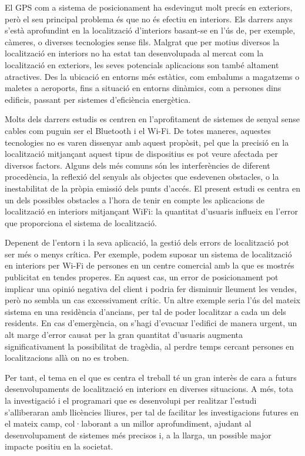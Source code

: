 
El GPS com a sistema de posicionament ha esdevingut molt precís en exteriors, però el seu principal problema és que no és efectiu en interiors. Els darrers anys s’està aprofundint en la localització d’interiors basant-se en l’ús de, per exemple, càmeres, o diverses tecnologies sense fils. Malgrat que per motius diversos la localització en interiors no ha estat tan desenvolupada al mercat com la localització en exteriors, les seves potencials aplicacions son també altament atractives. Des la ubicació en entorns més estàtics, com embalums a magatzems o maletes a aeroports, fins a situació en entorns dinàmics, com a persones dins edificis, passant per sistemes d'eficiència energètica.

Molts dels darrers estudis es centren en l’aprofitament de sistemes de senyal sense cables com puguin ser el Bluetooth i el Wi-Fi. De totes maneres, aquestes tecnologies no es varen dissenyar amb aquest propòsit, pel que la precisió en la localització mitjançant aquest tipus de dispositius es pot veure afectada per diversos factors. Alguns dels més comuns són les interferències de diferent procedència, la reflexió del senyals als objectes que esdevenen obstacles, o la inestabilitat de la pròpia emissió dels punts d'accés. El present estudi es centra en un dels possibles obstacles a l'hora de tenir en compte les aplicacions de localització en interiors mitjançant WiFi: la quantitat d'usuaris influeix en l’error que proporciona el sistema de localització.

Depenent de l’entorn i la seva aplicació, la gestió dels errors de localització pot ser més o menys crítica. Per exemple, podem suposar un sistema de localització en interiors per Wi-Fi de persones en un centre comercial amb la que es mostrés publicitat en tendes properes. En aquest cas, un error de posicionament pot implicar una opinió negativa del client i podria fer disminuir lleument les vendes, però no sembla un cas excessivament crític. Un altre exemple seria l’ús del mateix sistema en una residència d’ancians, per tal de poder localitzar a cada un dels residents. En cas d’emergència, on s’hagi d’evacuar l’edifici de manera urgent, un alt marge d’error causat per la gran quantitat d'usuaris augmenta significativament la possibilitat de tragèdia, al perdre temps cercant persones en localitzacions allà on no es troben.

Per tant, el tema en el que es centra el treball té un gran interès de cara a futurs desenvolupaments de localització en interiors en diverses situacions. A més, tota la investigació i el programari que es desenvolupi per realitzar l’estudi s’alliberaran amb llicències lliures, per tal de facilitar les investigacions futures en el mateix camp, col·laborant a un millor aprofundiment, ajudant al desenvolupament de sistemes més precisos i, a la llarga, un possible major impacte positiu en la societat.

